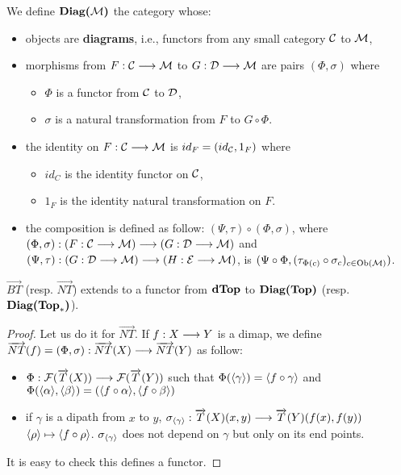 	We define $\textbf{Diag(}\mathcal{M}\textbf{)}$ the category whose:
\begin{itemize}
	\item objects are \textbf{diagrams}, i.e., functors from any small category $\mathcal{C}$ to $\mathcal{M}$,
	\item morphisms from $F : \mathcal{C} \longrightarrow \mathcal{M}$ to $G : \mathcal{D} \longrightarrow \mathcal{M}$ are pairs $(\Phi,\sigma)$ where
		\begin{itemize}
			\item $\Phi$ is a functor from $\mathcal{C}$ to $\mathcal{D}$,
			\item $\sigma$ is a natural transformation from $F$ to $G\circ\Phi$.
		\end{itemize}
	\item the identity on $F : \mathcal{C} \longrightarrow \mathcal{M}$ is $id_F = (id_{\mathcal{C}},1_F)$ where
		\begin{itemize}
			\item $id_C$ is the identity functor on $\mathcal{C}$,
			\item $1_F$ is the identity natural transformation on $F$.
		\end{itemize}
	\item the composition is defined as follow: $(\Psi,\tau)\circ(\Phi,\sigma)$, where $(\Phi,\sigma) : (F : \mathcal{C} \longrightarrow \mathcal{M}) \longrightarrow (G : \mathcal{D} \longrightarrow \mathcal{M})$ and $(\Psi,\tau) : (G : \mathcal{D} \longrightarrow \mathcal{M}) \longrightarrow (H : \mathcal{E} \longrightarrow \mathcal{M})$, is $(\Psi\circ\Phi, (\tau_{\Phi(c)}\circ\sigma_c)_{c\in\text{Ob}(\mathcal{M})})$.
\end{itemize}

\begin{prop}
	$\overrightarrow{BT}$ (resp. $\overrightarrow{NT}$) extends to a functor from $\textbf{dTop}$ to $\textbf{Diag(}\textbf{Top}\textbf{)}$ (resp. $\textbf{Diag(}\textbf{Top}_\ast\textbf{)}$).
\end{prop}

\begin{proof}
	Let us do it for $\overrightarrow{NT}$.
	If $f : X \longrightarrow Y$ is a dimap, we define $\overrightarrow{NT}(f) =(\Phi,\sigma) : \overrightarrow{NT}(X) \longrightarrow \overrightarrow{NT}(Y)$ as follow:
		\begin{itemize}
			\item $\Phi : \mathcal{F}(\overrightarrow{T}(X)) \longrightarrow \mathcal{F}(\overrightarrow{T}(Y))$ such that $\Phi(\langle\gamma\rangle) = \langle f\circ \gamma\rangle$ and $\Phi(\langle\alpha\rangle, \langle\beta\rangle) = (\langle f\circ\alpha\rangle, \langle f\circ\beta\rangle)$
			\item if $\gamma$ is a dipath from $x$ to $y$, $\sigma_{\langle\gamma\rangle} : \overrightarrow{T}(X)(x,y) \longrightarrow \overrightarrow{T}(Y)(f(x),f(y))$ ~~ $\langle\rho\rangle \mapsto \langle f\circ\rho\rangle$. $\sigma_{\langle\gamma\rangle}$ does not depend on $\gamma$ but only on its end points.
		\end{itemize}
		It is easy to check this defines a functor.
	\end{proof}
	
